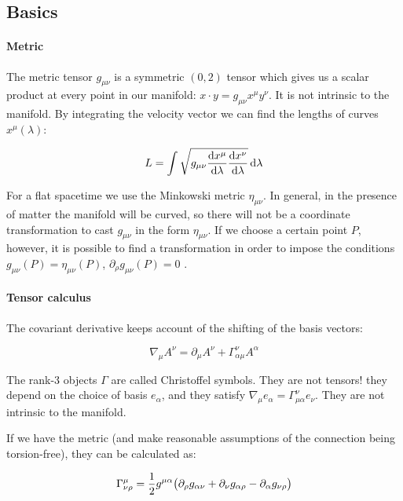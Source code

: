 \documentclass[main.tex]{subfiles}
\begin{document}
\subsection{Basics}

\paragraph{Metric}

The metric tensor \(g_{\mu\nu}\) is a symmetric \((0,2)\) tensor which gives us a scalar product at every point in our manifold: \(x \cdot y = g_{\mu\nu} x^\mu y^\nu\).
It is not intrinsic to the manifold.
By integrating the velocity vector we can find the lengths of curves \(x^\mu(\lambda)\):

\begin{equation}
    L = \int \sqrt{g_{\mu\nu} \dv{x^\mu}{\lambda} \dv{x^\nu}{\lambda} }  \dd{\lambda}
\end{equation}

For a flat spacetime we use the Minkowski metric \(\eta_{\mu\nu}\). In general, in the presence of matter the manifold will be curved, so there will not be a coordinate transformation to cast \(g_{\mu\nu}\) in the form \(\eta_{\mu\nu}\). If we choose a certain point \(P\), however, it is possible to find a transformation in order to impose the conditions \(g_{\mu\nu}(P)=\eta_{\mu\nu}(P)\), \(\partial_\rho g_{\mu\nu}(P) = 0\) \cite[pages 49--50]{Carroll:1997ar}.

\paragraph{Tensor calculus}

The covariant derivative keeps account of the shifting of the basis vectors:

\begin{equation}
    \nabla_\mu A^\nu = \partial_\mu A^\nu + \Gamma^\nu _{\alpha \mu}  A^\alpha
\end{equation}

The rank-3 objects $\Gamma$ are called Christoffel symbols. They are not tensors! they depend on the choice of basis $e_\alpha$, and they satisfy $\nabla _\mu e_\alpha = \Gamma ^\nu _{\mu \alpha} e_\nu$. They are not intrinsic to the manifold.

If we have the metric (and make reasonable assumptions of the connection being torsion-free), they can be calculated as:

\begin{equation}
    \Gamma^\mu_{\nu \rho} = \frac{1}{2} g^{\mu \alpha} \qty(
    \partial_\rho g_{\alpha \nu} +
    \partial_\nu g_{\alpha \rho} -
    \partial_\alpha g_{\nu \rho}
    ) \label{eq:christoffel-symbols-from-metric}
\end{equation}
\end{document}
